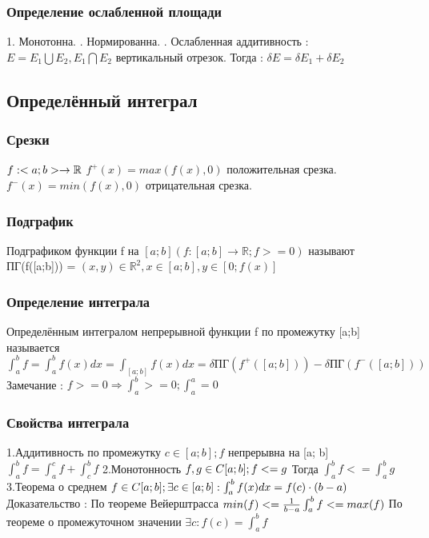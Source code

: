 ﻿\documentclass[12pt, a4paper]{article}
\newcommand{\nl}{\newline}
\newcommand{\intba}{\int^b_a}
\begin{document}
        \subsubsection{Определение ослабленной площади}
        1. Монотонна. \nl
        2. Нормированна. \nl
        3. Ослабленная аддитивность : $E = E_1 \bigcup E_2, E_1 \bigcap E_2$ вертикальный отрезок.\nl 
        Тогда : $\delta E = \delta E_1 + \delta E_2$
        
        
    \subsection{Определённый интеграл}
        \subsubsection{Срезки}
        
        $f : <a; b> \rightarrow \mathbb{R} \nl$
        $f^+(x) = max(f(x), 0)$ положительная срезка. \nl
        $f^-(x) = min(f(x), 0)$ отрицательная срезка. \nl
        
        \subsubsection{Подграфик}
        Подграфиком функции f на $[a; b] (f : [a;b]\rightarrow \mathbb{R}; f>=0)$ называют \nl
        ПГ(f([a;b])) = {$(x, y) \in \mathbb{R}^2, x \in [a; b], y \in [0; f(x)]$}
        
        \subsubsection{Определение интеграла}
        Определённым интегралом непрерывной функции f по промежутку [a;b] называется \nl
        $\int^b_a f = \int^b_a f(x) dx = \int_{[a; b]} f(x) dx = \delta \text{ПГ}(f^+([a; b])) - \delta \text{ПГ}(f^-([a; b]))$ \nl
        Замечание : $f>=0 \Rightarrow \int^b_a >=0; \int^a_a = 0$
        
        \subsubsection{Свойства интеграла}
        1.Аддитивность по промежутку \nl
        $c \in [a;b]; f$ непрерывна на [a; b] \nl
        $\int_a^b f = \int_a^c f + \int^b_c f$ \nl
        2.Монотонность \nl
        $f, g \in C[a; b]; f<=g \nl$
        Тогда $\int^b_a f <= \int^b_a g$ \nl
        3.Теорема о среднем \nl
        $f \in C[a;b]; \exists c \in [a;b] : \int^b_a f(x)dx = f(c) \cdot (b-a) \nl$
        Доказательство : \nl
        По теореме Вейерштрасса $min(f) <= \frac{1}{b-a}\intba f <=max(f) \nl$
        По теореме о промежуточном значении $\exists c : f(c) = \intba f$
        
\end{document}
